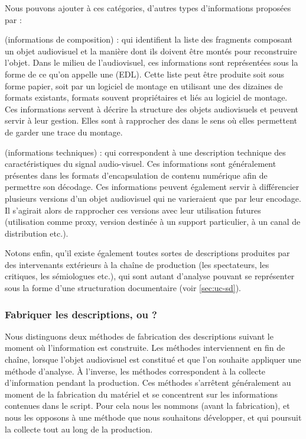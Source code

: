 Nous pouvons ajouter à ces catégories, d'autres types d'informations proposées par \cite{Rayers2002} : 
\begin{liste} 
	\item {} (informations de composition) : qui identifient la liste des fragments composant un objet audiovisuel et la manière dont ils doivent être montés pour reconstruire l'objet. 
	Dans le milieu de l'audiovisuel, ces informations sont représentées sous la forme de ce qu'on appelle une  (EDL).
	Cette liste peut être produite soit sous forme papier, soit par un logiciel de montage en utilisant une des dizaines de formats existants, formats souvent propriétaires et liés au logiciel de montage. 
	Ces informations servent à décrire la structure des objets audiovisuels et peuvent servir à leur gestion.
	Elles sont à rapprocher des  dans le sens où elles permettent de garder une trace du montage. 


	\item {} (informations techniques) : qui correspondent à une description technique des caractéristiques du signal audio-visuel. 
	Ces informations sont généralement présentes dans les formats d'encapsulation de contenu numérique afin de permettre son décodage.
	Ces informations peuvent également servir à différencier plusieurs versions d'un objet audiovisuel qui ne varieraient que par leur encodage. 
	Il s'agirait alors de rapprocher ces versions avec leur utilisation futures (utilisation comme proxy, version destinée à un support particulier, à un canal de distribution etc.).
\end{liste}


Notons enfin, qu'il existe également toutes sortes de descriptions produites par des intervenants extérieurs à la chaîne de production (les spectateurs, les critiques, les sémiologues etc.), qui sont autant d'analyse pouvant se représenter sous la forme d'une structuration documentaire (voir \ref{sec:uc-sd}).



\subsubsection{Fabriquer les descriptions,  ou  ?}\label{sec:codesc}
Nous distinguons deux méthodes de fabrication des descriptions suivant le moment où l'information est construite.
Les méthodes  interviennent en fin de chaîne, lorsque l'objet audiovisuel est constitué et que l'on souhaite appliquer une méthode d'analyse. 
À l'inverse, les méthodes  correspondent à la collecte d'information pendant la production. 
Ces méthodes s'arrêtent généralement au moment de la fabrication du matériel et se concentrent sur les informations contenues dans le script. 
Pour cela nous les nommons  (avant la fabrication), et nous les opposons à une méthode  que nous souhaitons développer, et qui poursuit la collecte tout au long de la production.


